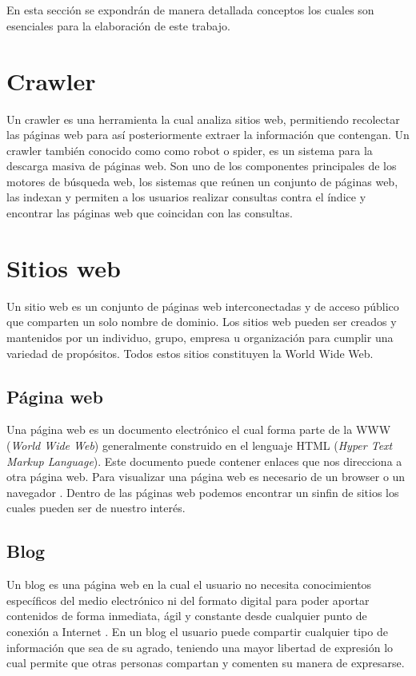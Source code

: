 
\ \\\\
En esta sección se expondrán de manera detallada conceptos los cuales son esenciales para la elaboración de este trabajo.


\section{Crawler}
Un crawler \cite{once} es una herramienta la cual analiza sitios web, permitiendo recolectar las páginas web para así posteriormente extraer la información que contengan. Un crawler también conocido como como robot o spider, es un sistema para la descarga masiva de páginas web. Son uno de los componentes principales de los motores de búsqueda web, los sistemas que reúnen un conjunto de páginas web, las indexan y permiten a los usuarios realizar consultas contra el índice y encontrar las páginas web que coincidan con las consultas.


\section{Sitios web}
Un sitio web \cite{doce} es un conjunto de páginas web interconectadas y de acceso público que comparten un solo nombre de dominio. Los sitios web pueden ser creados y mantenidos por un individuo, grupo, empresa u organización para cumplir una variedad de propósitos. Todos estos sitios constituyen la World Wide Web. 

\subsection{Página web}
Una página web es un documento electrónico el cual forma parte de la WWW (\textit{World Wide Web}) generalmente construido en el lenguaje HTML (\textit{Hyper Text Markup Language}). Este documento puede contener enlaces que nos direcciona a otra página web. Para visualizar una página web es necesario de un browser o un navegador \cite{trece}. Dentro de las páginas web podemos encontrar un sinfin de sitios los cuales pueden ser de nuestro interés.

\subsection{Blog}
Un blog es una página web en la cual el usuario no necesita conocimientos específicos del medio electrónico ni del formato digital para poder aportar contenidos de forma inmediata, ágil y constante desde cualquier punto de conexión a Internet \cite{catorce}. En un blog el usuario puede compartir cualquier tipo de información que sea de su agrado, teniendo una mayor libertad de expresión lo cual permite que otras personas compartan y comenten su manera de expresarse.

